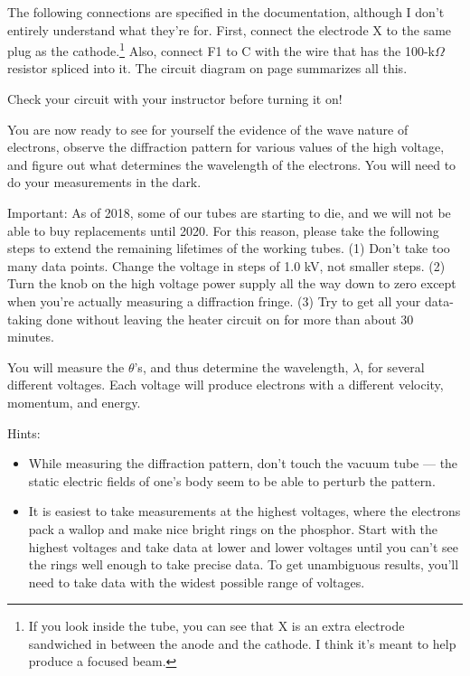 The following connections are specified in the documentation,
although I don't entirely understand what they're for.
First, connect the electrode X to the same plug as the
cathode.\footnote{If you look inside the tube, you can see
that X is an extra electrode sandwiched in between the anode
and the cathode. I think it's meant to help produce a focused
beam.}
Also, connect F1 to C with the wire that has the 100-k$\Omega$
resistor spliced into it. The circuit diagram on page \pageref{fig:mo-edf-circuit} summarizes
all this.

Check your circuit with your instructor before turning it on!


\observations

You are now ready to see for yourself the evidence of the
wave nature of electrons, observe the diffraction pattern
for various values of the high voltage, and figure out what
determines the wavelength of the electrons. You will need to
do your measurements in the dark.

Important: As of 2018, some of our tubes are starting to die, and we
will not be able to buy replacements until 2020. For this reason, please
take the following steps to extend the remaining lifetimes of the working
tubes. (1) Don't take too many data points. Change the voltage in steps of
1.0 kV, not smaller steps. (2) Turn the knob on the high voltage power supply
all the way down to zero except when you're actually measuring a diffraction
fringe. (3) Try to get all your data-taking done without leaving the heater
circuit on for more than about 30 minutes.

You will measure the $\theta $'s, and thus determine the
wavelength, $\lambda $, for several different voltages. Each
voltage will produce electrons with a different velocity,
momentum, and energy.  

Hints:

\begin{itemize}
\item[] While measuring the diffraction pattern, don't touch the
vacuum tube --- the static electric fields of one's body
seem to be able to perturb the pattern.

\item[] It is easiest to take measurements at the highest
voltages, where the electrons pack a wallop and make nice
bright rings on the phosphor. Start with the highest
voltages and take data at lower and lower voltages until you
can't see the rings well enough to take precise data. To get
unambiguous results, you'll need to take data with the
widest possible range of voltages.

\end{itemize}

